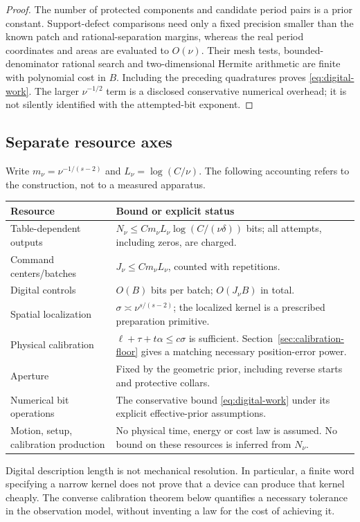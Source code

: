 \begin{proof}
The number of protected components and candidate period pairs is a
prior constant. Support-defect comparisons need only a fixed precision
smaller than the known patch and rational-separation margins, whereas
the real period coordinates and areas are evaluated to $O(\nu)$.
Their mesh tests, bounded-denominator rational search and two-dimensional
Hermite arithmetic are finite with polynomial cost in $B$. Including
the preceding quadratures proves \eqref{eq:digital-work}. The larger
$\nu^{-1/2}$ term is a disclosed conservative numerical overhead; it
is not silently identified with the attempted-bit exponent.
\end{proof}

\subsection{Separate resource axes}
Write $m_\nu=\nu^{-1/(s-2)}$ and $L_\nu=\log(C/\nu)$. The following
accounting refers to the construction, not to a measured apparatus.
\begin{center}
\small
\begin{tabular}{@{}p{}p{}@{}}
\toprule
Resource & Bound or explicit status\\
\midrule
Table-dependent outputs & $N_\nu\le C m_\nu L_\nu\log(C/(\nu\delta))$ bits;
all attempts, including zeros, are charged.\\[3pt]
Command centers/batches & $J_\nu\le C m_\nu L_\nu$, counted with repetitions.\\[3pt]
Digital controls & $O(B)$ bits per batch; $O(J_\nu B)$ in total.\\[3pt]
Spatial localization & $\sigma\asymp\nu^{s/(s-2)}$; the localized kernel
is a prescribed preparation primitive.\\[3pt]
Physical calibration & $\ell+\tau+t\alpha\le c\sigma$ is sufficient.
Section~\ref{sec:calibration-floor} gives a matching necessary position-error power.\\[3pt]
Aperture & Fixed by the geometric prior, including reverse starts and
protective collars.\\[3pt]
Numerical bit operations & The conservative bound \eqref{eq:digital-work}
under its explicit effective-prior assumptions.\\[3pt]
Motion, setup, calibration production & No physical time, energy or
cost law is assumed. No bound on these resources is inferred from $N_\nu$.\\
\bottomrule
\end{tabular}
\end{center}
Digital description length is not mechanical resolution. In particular,
a finite word specifying a narrow kernel does not prove that a device
can produce that kernel cheaply. The converse calibration theorem
below quantifies a necessary tolerance in the observation model,
without inventing a law for the cost of achieving it.
